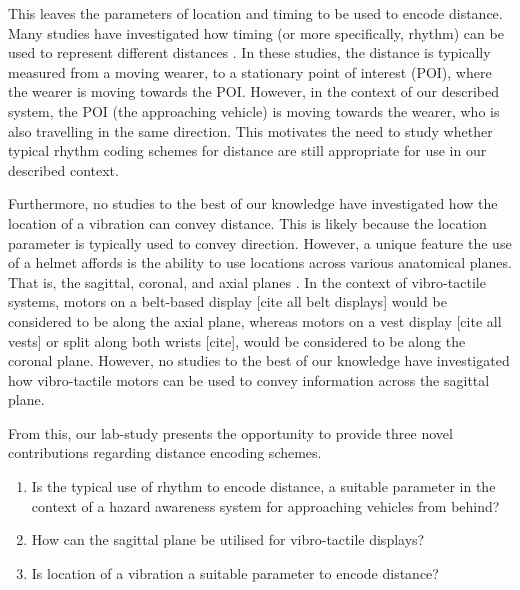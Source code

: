 \documentclass{interim}
\begin{document}
This leaves the parameters of location and timing to be used to encode distance. Many studies have investigated how timing (or more specifically, rhythm) can be used to represent different distances \cite{10.1145/1060581.1060585, 5326374, 10.1145/1520340.1520718, 10.1145/1753326.1753581, 10.1145/1868914.1868923}. In these studies, the distance is typically measured from a moving wearer, to a stationary point of interest (POI), where the wearer is moving towards the POI. However, in the context of our described system, the POI (the approaching vehicle) is moving towards the wearer, who is also travelling in the same direction. This motivates the need to study whether typical rhythm coding schemes for distance are still appropriate for use in our described context.

Furthermore, no studies to the best of our knowledge have investigated how the location of a vibration can convey distance. This is likely because the location parameter is typically used to convey direction. However, a unique feature the use of a helmet affords is the ability to use locations across various anatomical planes. That is, the sagittal, coronal, and axial planes \cite{anatomical}. In the context of vibro-tactile systems, motors on a belt-based display [cite all belt displays] would be considered to be along the axial plane, whereas motors on a vest display [cite all vests] or split along both wrists [cite], would be considered to be along the coronal plane. However, no studies to the best of our knowledge have investigated how vibro-tactile motors can be used to convey information across the sagittal plane.

From this, our lab-study presents the opportunity to provide three novel contributions regarding distance encoding schemes.
\begin{enumerate}
    \item Is the typical use of rhythm to encode distance, a suitable parameter in the context of a hazard awareness system for approaching vehicles from behind?
    \item How can the sagittal plane be utilised for vibro-tactile displays?
    \item Is location of a vibration a suitable parameter to encode distance?
\end{enumerate}
\end{document}
